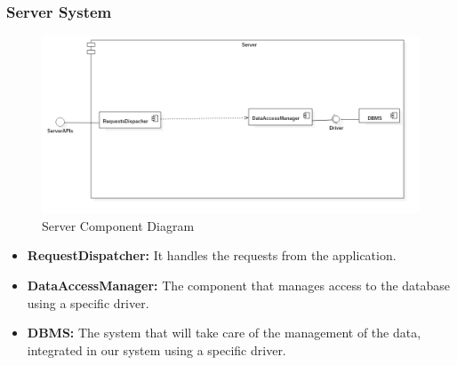 \subsubsection{Server System}
\begin{figure}[!h]
\centering
\includegraphics[scale=0.4]{images/ComponentDiagramServer}
\caption{Server Component Diagram}
\label{ref:componentdiagramserver}
\end{figure}
\begin{itemize}
\item
\textbf{RequestDispatcher:} It handles the requests from the application.
\item
\textbf{DataAccessManager:} The component that manages access to the database using a specific driver.
\item
\textbf{DBMS:} The system that will take care of the management of the data, integrated in our system using a specific driver.
\end{itemize}
